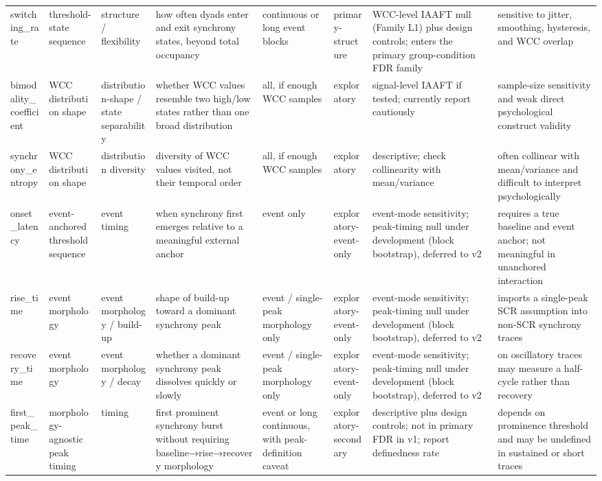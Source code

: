 \begin{longtable}{p{}p{}p{}p{}p{}p{}p{}p{}}
switching\_rate & threshold-state sequence & structure / flexibility & how often dyads enter and exit synchrony states, beyond total occupancy & continuous or long event blocks & primary-structure & WCC-level IAAFT null (Family L1) plus design controls; enters the primary group-condition FDR family & sensitive to jitter, smoothing, hysteresis, and WCC overlap \\
bimodality\_coefficient & WCC distribution shape & distribution-shape / state separability & whether WCC values resemble two high/low states rather than one broad distribution & all, if enough WCC samples & exploratory & signal-level IAAFT if tested; currently report cautiously & sample-size sensitivity and weak direct psychological construct validity \\
synchrony\_entropy & WCC distribution shape & distribution diversity & diversity of WCC values visited, not their temporal order & all, if enough WCC samples & exploratory & descriptive; check collinearity with mean/variance & often collinear with mean/variance and difficult to interpret psychologically \\
onset\_latency & event-anchored threshold sequence & event timing & when synchrony first emerges relative to a meaningful external anchor & event only & exploratory-event-only & event-mode sensitivity; peak-timing null under development (block bootstrap), deferred to v2 & requires a true baseline and event anchor; not meaningful in unanchored interaction \\
rise\_time & event morphology & event morphology / build-up & shape of build-up toward a dominant synchrony peak & event / single-peak morphology only & exploratory-event-only & event-mode sensitivity; peak-timing null under development (block bootstrap), deferred to v2 & imports a single-peak SCR assumption into non-SCR synchrony traces \\
recovery\_time & event morphology & event morphology / decay & whether a dominant synchrony peak dissolves quickly or slowly & event / single-peak morphology only & exploratory-event-only & event-mode sensitivity; peak-timing null under development (block bootstrap), deferred to v2 & on oscillatory traces may measure a half-cycle rather than recovery \\
first\_peak\_time & morphology-agnostic peak timing & timing & first prominent synchrony burst without requiring baseline→rise→recovery morphology & event or long continuous, with peak-definition caveat & exploratory-secondary & descriptive plus design controls; not in primary FDR in v1; report definedness rate & depends on prominence threshold and may be undefined in sustained or short traces \\

\end{longtable}
